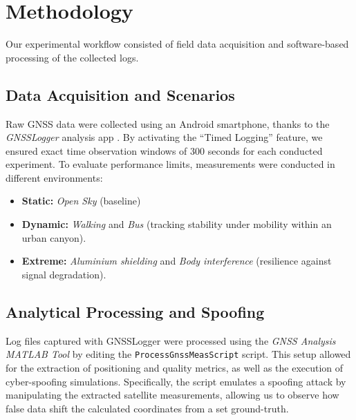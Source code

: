 \section{Methodology}
\label{sec:methodology}

Our experimental workflow consisted of field data acquisition and software-based processing of the collected logs.

\subsection{Data Acquisition and Scenarios}
Raw GNSS data were collected using an Android smartphone, thanks to the \textit{GNSSLogger} analysis app \cite{GNSS_logger}. By activating the ``Timed Logging'' feature, we ensured exact time observation windows of 300 seconds for each conducted experiment. To evaluate performance limits, measurements were conducted in different environments:
\begin{itemize}
\item \textbf{Static:} \textit{Open Sky} (baseline)
\item \textbf{Dynamic:} \textit{Walking} and \textit{Bus} (tracking stability under mobility within an urban canyon).
\item \textbf{Extreme:} \textit{Aluminium shielding} and \textit{Body interference}  (resilience against signal degradation).
\end{itemize}

\subsection{Analytical Processing and Spoofing}
Log files captured with GNSSLogger were processed using the \textit{GNSS Analysis MATLAB Tool} \cite{GPS_Measurement_tools} by editing the \texttt{ProcessGnssMeasScript} script. This setup allowed for the extraction of positioning and quality metrics, as well as the execution of cyber-spoofing simulations. Specifically, the script emulates a spoofing attack by manipulating the extracted satellite measurements, allowing us to observe how false data shift the calculated coordinates from a set ground-truth.

